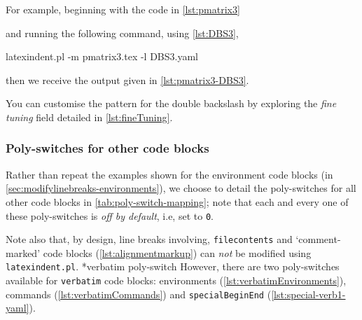 \documentclass[10pt]{article}
\begin{document}
  \begin{example}
  For example, beginning with the code in \cref{lst:pmatrix3}


  and running the following command, using \cref{lst:DBS3},  

  \begin{commandshell}
latexindent.pl -m pmatrix3.tex -l DBS3.yaml
\end{commandshell}

  then we receive the output given in \cref{lst:pmatrix3-DBS3}.

  \end{example}

  You can customise the pattern for the double backslash by exploring the \emph{fine
  tuning} field detailed in \vref{lst:fineTuning}.

\subsubsection{Poly-switches for other code blocks}
 Rather than repeat the examples shown for the environment code blocks (in
 \vref{sec:modifylinebreaks-environments}), we choose to detail the poly-switches for all
 other code blocks in \cref{tab:poly-switch-mapping}; note that each and every one of
 these poly-switches is \emph{off by default}, i.e, set to \texttt{0}.

 Note also that, by design, line breaks involving, \texttt{filecontents} and
 `comment-marked' code blocks (\vref{lst:alignmentmarkup}) can \emph{not} be modified
 using \texttt{latexindent.pl}. *{verbatim poly-switch} However,
 there are two poly-switches available for \texttt{verbatim} code blocks: environments
 (\vref{lst:verbatimEnvironments}), commands (\vref{lst:verbatimCommands}) and
 \texttt{specialBeginEnd} (\vref{lst:special-verb1-yaml}).
  
\end{document}
